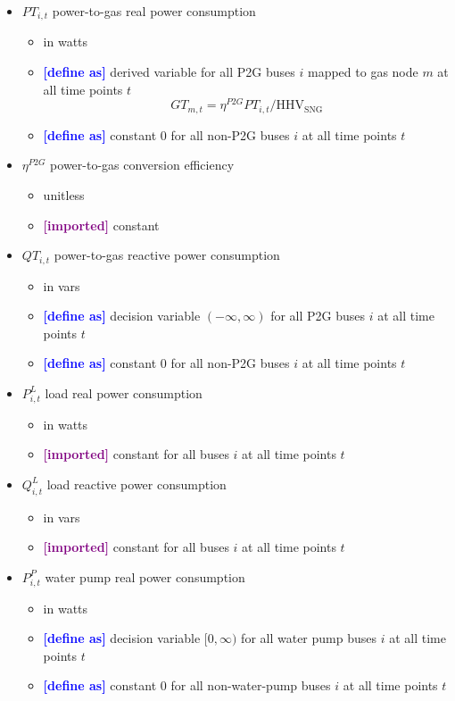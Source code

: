 \documentclass{article}
\newcommand{\define}{\textcolor{blue}{\textbf{[define as] }}}
\newcommand{\imported}{\textcolor{purple}{\textbf{[imported] }}}
\begin{document}
\begin{itemize}
\item $PT_{i,t}$ power-to-gas real power consumption
  \begin{itemize}
  \item in watts
  \item \define derived variable for all P2G buses $i$ mapped to gas node $m$ at
    all time points $t$
    \begin{equation*}
      GT_{m,t} = \eta^{P2G}PT_{i,t}/\text{HHV}_\text{SNG}
    \end{equation*}
  \item \define constant $0$ for all non-P2G buses $i$ at all time points $t$
  \end{itemize}

\item $\eta^{P2G}$ power-to-gas conversion efficiency
  \begin{itemize}
  \item unitless
  \item \imported constant
  \end{itemize}

\item $QT_{i,t}$ power-to-gas reactive power consumption
  \begin{itemize}
  \item in vars
  \item \define decision variable $(-\infty, \infty)$ for all P2G buses $i$ at
    all time points $t$
  \item \define constant $0$ for all non-P2G buses $i$ at all time points $t$
  \end{itemize}

\item $P^L_{i,t}$ load real power consumption
  \begin{itemize}
  \item in watts
  \item \imported constant for all buses $i$ at all time points $t$
  \end{itemize}

\item $Q^L_{i,t}$ load reactive power consumption
  \begin{itemize}
  \item in vars
  \item \imported constant for all buses $i$ at all time points $t$
  \end{itemize}

  \item $P^P_{i,t}$ water pump real power consumption
  \begin{itemize}
  \item in watts
  \item \define decision variable $[0, \infty)$ for all water pump buses $i$ at
    all time points $t$
  \item \define constant $0$ for all non-water-pump buses $i$ at all time points
    $t$
  \end{itemize}


\end{itemize}
\end{document}
